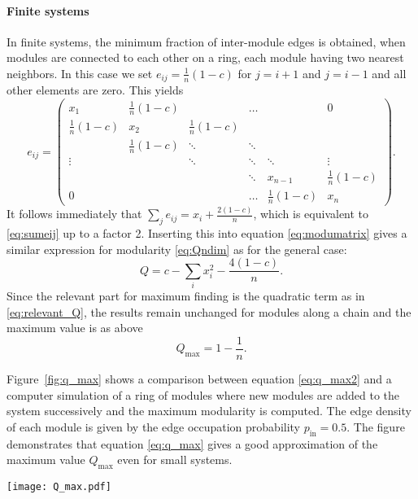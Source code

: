\paragraph{Finite systems\color{Cayenne}{.}}
In finite systems, the minimum fraction of inter-module edges is obtained, when modules are connected to each other on a ring, each module having two nearest neighbors.
In this case we set  $e_{ij}= \frac{1}{n}(1-c)$ for $j=i+1$ and $j=i-1$ and all other elements are zero.
This yields
\begin{equation}\label{eq:ring_module_matrix}
e_{ij}=\left(\begin{array}{cccccc}
x_1 & \frac{1}{n}(1-c)&  & \hdots &  & 0 \\ 
\frac{1}{n}(1-c)& x_2 &\frac{1}{n}(1-c)&  &  &  \\
 & \frac{1}{n}(1-c) & \ddots & \ddots & & \\
\vdots &  & \ddots & \ddots & \ddots &\vdots \\
 & & & \ddots   &  x_{n-1} &\frac{1}{n}(1-c) \\
0 & &  & \hdots & \frac{1}{n}(1-c) & x_n
\end{array}
\right) .
\end{equation}
It follows immediately that $\sum _j e_{ij}=x_i+\frac{2(1-c)}{n}$, which is equivalent to \eqref{eq:sumeij} up to a factor 2.
Inserting this into equation \eqref{eq:modumatrix} gives a similar expression for modularity \eqref{eq:Qndim} as for the general case:
\begin{equation*}
Q=c-\sum _i x_i^2 - \frac{4(1-c)}{n} .
\end{equation*}
Since the relevant part for maximum finding is the quadratic term as in \eqref{eq:relevant_Q}, the results remain unchanged for modules along a chain and the maximum value is as above
\begin{equation}\label{eq:q_max2}
Q_\mathrm{max}=1-\frac{1}{n}.
\end{equation}

Figure~\ref{fig:q_max} shows a comparison between equation \eqref{eq:q_max2} and a computer simulation of a ring of modules where new modules are added to the system successively and the maximum modularity is computed. 
The edge density of each module is given by the edge occupation probability $p_\mathrm{in}=0.5$.
The figure demonstrates that equation \eqref{eq:q_max} gives a good approximation of the maximum value $Q_\mathrm{max}$ even for small systems.
%
\begin{SCfigure}
\texttt{[image: Q\_max.pdf]}
\caption{Equation \eqref{eq:q_max2} (grey dashed line) reproduces the values found by numerical simulations (red circles).
In the simulations, modules are dense, directed subgraphs ($p_\mathrm{in}=0.5$) with $32$ nodes each.
Modules are connected on a ring so that the resulting graph is connected.
}
\label{fig:q_max}
\end{SCfigure}

